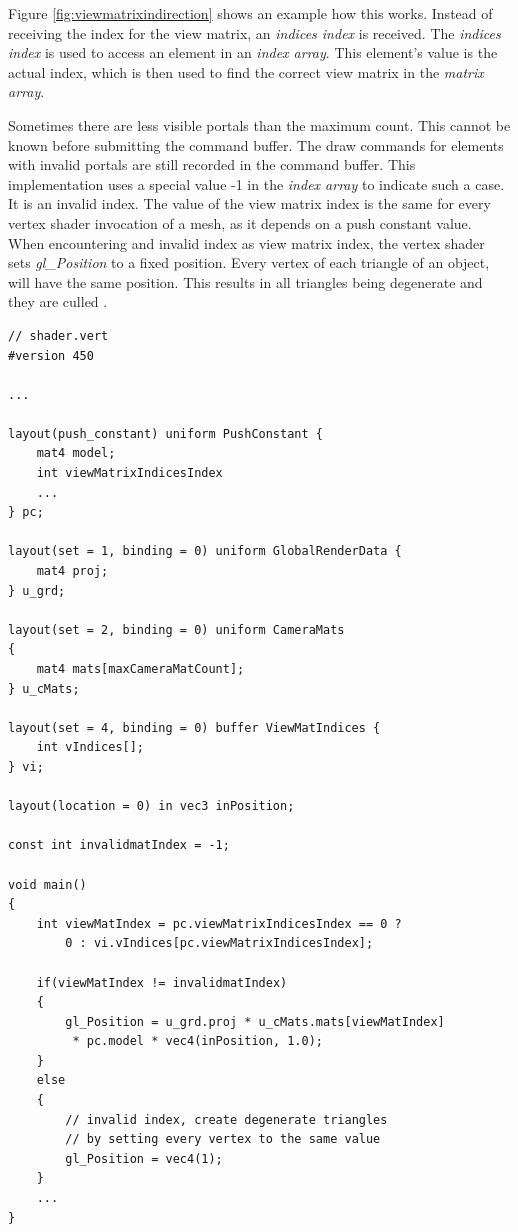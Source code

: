 Figure \ref{fig:viewmatrixindirection} shows an example how this works. Instead of receiving the index for the view matrix, an \textit{indices index} is received. The \textit{indices index} is used to access an element in an \textit{index array}. This element's value is the actual index, which is then used to find the correct view matrix in the \textit{matrix array}.

Sometimes there are less visible portals than the maximum count. This cannot be known before submitting the command buffer. The draw commands for elements with invalid portals are still recorded in the command buffer. This implementation uses a special value -1 in the \textit{index array} to indicate such a case. It is an invalid index. The value of the view matrix index is the same for every vertex shader invocation of a mesh, as it depends on a push constant value. When encountering and invalid index as view matrix index, the vertex shader sets \textit{gl\_Position} to a fixed position. Every vertex of each triangle of an object, will have the same position. This results in all triangles being degenerate and they are culled \cite{khronos:vulkan:spec1.1}.

\begin{lstlisting}[caption={View Matrix Selection}, label=listing:viewmatrixselection]
// shader.vert
#version 450

...

layout(push_constant) uniform PushConstant {	
	mat4 model;
	int viewMatrixIndicesIndex
	...
} pc;

layout(set = 1, binding = 0) uniform GlobalRenderData {
	mat4 proj;
} u_grd;

layout(set = 2, binding = 0) uniform CameraMats
{
	mat4 mats[maxCameraMatCount];
} u_cMats;

layout(set = 4, binding = 0) buffer ViewMatIndices {
	int vIndices[];
} vi;

layout(location = 0) in vec3 inPosition;

const int invalidmatIndex = -1;

void main()
{
	int viewMatIndex = pc.viewMatrixIndicesIndex == 0 ? 
		0 : vi.vIndices[pc.viewMatrixIndicesIndex];
	
	if(viewMatIndex != invalidmatIndex)
	{
		gl_Position = u_grd.proj * u_cMats.mats[viewMatIndex]
		 * pc.model * vec4(inPosition, 1.0);
	}
	else
	{
		// invalid index, create degenerate triangles
		// by setting every vertex to the same value
		gl_Position = vec4(1);
	}
	...
}

\end{lstlisting}

